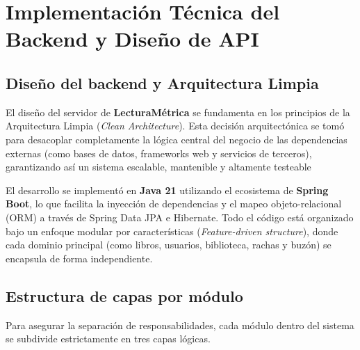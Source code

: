 \documentclass[12pt, atypical, journal]{article}
\begin{document}
\newpage

\section{Implementación Técnica del Backend y Diseño de API}

\subsection{Diseño del backend y Arquitectura Limpia}
El diseño del servidor de \textbf{LecturaMétrica} se fundamenta en los principios de la Arquitectura Limpia (\textit{Clean Architecture}). Esta decisión arquitectónica se tomó para desacoplar completamente la lógica central del negocio de las dependencias externas (como bases de datos, frameworks web y servicios de terceros), garantizando así un sistema escalable, mantenible y altamente testeable

El desarrollo se implementó en \textbf{Java 21} utilizando el ecosistema de \textbf{Spring Boot}, lo que facilita la inyección de dependencias y el mapeo objeto-relacional (ORM) a través de Spring Data JPA e Hibernate. 
Todo el código está organizado bajo un enfoque modular por características (\textit{Feature-driven structure}), donde cada dominio principal (como libros, usuarios, biblioteca, rachas y buzón) se encapsula de forma independiente.

\subsection{Estructura de capas por módulo}
Para asegurar la separación de responsabilidades, cada módulo dentro del sistema se subdivide estrictamente en tres capas lógicas.
\end{document}
